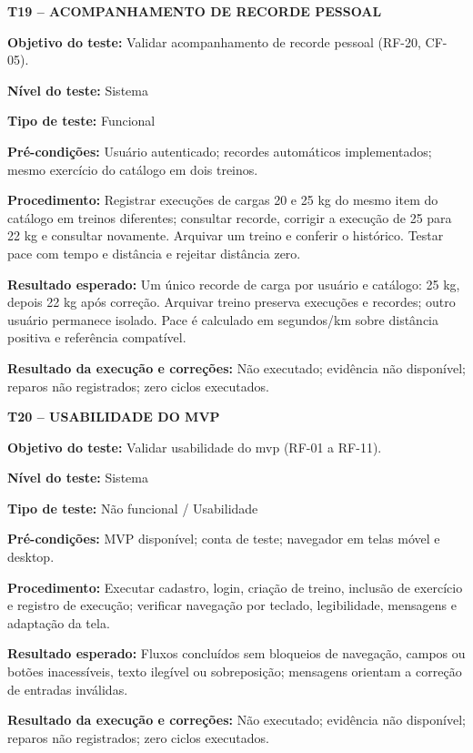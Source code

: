 \textbf{T19 -- ACOMPANHAMENTO DE RECORDE PESSOAL}

\noindent\textbf{Objetivo do teste:} Validar acompanhamento de recorde pessoal (RF-20, CF-05).

\noindent\textbf{Nível do teste:} Sistema

\noindent\textbf{Tipo de teste:} Funcional

\noindent\textbf{Pré-condições:} Usuário autenticado; recordes automáticos implementados; mesmo exercício do catálogo em dois treinos.

\noindent\textbf{Procedimento:} Registrar execuções de cargas 20 e 25 kg do mesmo item do catálogo em treinos diferentes; consultar recorde, corrigir a execução de 25 para 22 kg e consultar novamente. Arquivar um treino e conferir o histórico. Testar pace com tempo e distância e rejeitar distância zero.

\noindent\textbf{Resultado esperado:} Um único recorde de carga por usuário e catálogo: 25 kg, depois 22 kg após correção. Arquivar treino preserva execuções e recordes; outro usuário permanece isolado. Pace é calculado em segundos/km sobre distância positiva e referência compatível.

\noindent\textbf{Resultado da execução e correções:} Não executado; evidência não disponível; reparos não registrados; zero ciclos executados.

\textbf{T20 -- USABILIDADE DO MVP}

\noindent\textbf{Objetivo do teste:} Validar usabilidade do mvp (RF-01 a RF-11).

\noindent\textbf{Nível do teste:} Sistema

\noindent\textbf{Tipo de teste:} Não funcional / Usabilidade

\noindent\textbf{Pré-condições:} MVP disponível; conta de teste; navegador em telas móvel e desktop.

\noindent\textbf{Procedimento:} Executar cadastro, login, criação de treino, inclusão de exercício e registro de execução; verificar navegação por teclado, legibilidade, mensagens e adaptação da tela.

\noindent\textbf{Resultado esperado:} Fluxos concluídos sem bloqueios de navegação, campos ou botões inacessíveis, texto ilegível ou sobreposição; mensagens orientam a correção de entradas inválidas.

\noindent\textbf{Resultado da execução e correções:} Não executado; evidência não disponível; reparos não registrados; zero ciclos executados.

